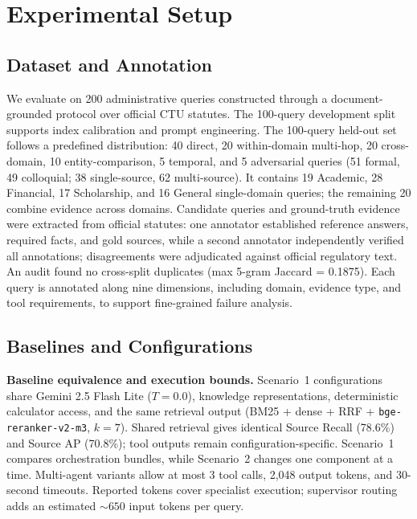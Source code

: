 \section{Experimental Setup}
\label{sec:exp_setup}

\subsection{Dataset and Annotation}
\label{sec:dataset}

We evaluate \system{} on 200 administrative queries constructed through a document-grounded protocol over official CTU statutes. The 100-query development split supports index calibration and prompt engineering. The 100-query held-out set follows a predefined distribution: 40 direct, 20 within-domain multi-hop, 20 cross-domain, 10 entity-comparison, 5 temporal, and 5 adversarial queries (51 formal, 49 colloquial; 38 single-source, 62 multi-source). It contains 19 Academic, 28 Financial, 17 Scholarship, and 16 General single-domain queries; the remaining 20 combine evidence across domains. Candidate queries and ground-truth evidence were extracted from official statutes: one annotator established reference answers, required facts, and gold sources, while a second annotator independently verified all annotations; disagreements were adjudicated against official regulatory text. An audit found no cross-split duplicates (max 5-gram Jaccard = 0.1875). Each query is annotated along nine dimensions, including domain, evidence type, and tool requirements, to support fine-grained failure analysis.

\subsection{Baselines and Configurations}
\label{sec:baselines}

\textbf{Baseline equivalence and execution bounds.} Scenario~1 configurations share Gemini 2.5 Flash Lite ($T{=}0.0$), knowledge representations, deterministic calculator access, and the same retrieval output (BM25 + dense + RRF + \texttt{bge-reranker-v2-m3}, $k{=}7$). Shared retrieval gives identical Source Recall (78.6\%) and Source AP (70.8\%); tool outputs remain configuration-specific. Scenario~1 compares orchestration bundles, while Scenario~2 changes one component at a time. Multi-agent variants allow at most 3 tool calls, 2{,}048 output tokens, and 30-second timeouts. Reported tokens cover specialist execution; supervisor routing adds an estimated ${\sim}650$ input tokens per query.

